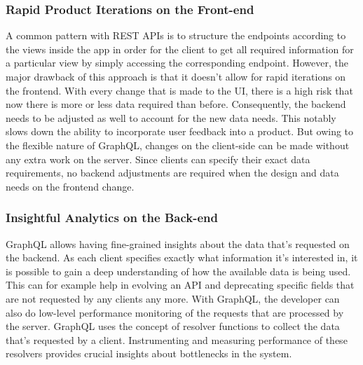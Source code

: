 \subsubsection{Rapid Product Iterations on the Front-end}

A common pattern with REST APIs is to structure the endpoints according to the views inside the app 
in order for the client to get all required information for a particular view by simply accessing the corresponding 
endpoint. However, the major drawback of this approach is that it doesn’t allow for rapid iterations on the frontend. 
With every change that is made to the UI, there is a high risk that now there is more or less data required than before.
Consequently, the backend needs to be adjusted as well to account for the new data needs. This notably slows down the 
ability to incorporate user feedback into a product. But owing to the flexible nature of GraphQL, changes on the 
client-side can be made without any extra work on the server. Since clients can specify their exact data requirements, 
no backend adjustments are required when the design and data needs on the frontend change.

\subsubsection{Insightful Analytics on the Back-end}

GraphQL allows having fine-grained insights about the data that’s requested on the backend. As each client specifies 
exactly what information it’s interested in, it is possible to gain a deep understanding of how the available data is being 
used. This can for example help in evolving an API and deprecating specific fields that are not requested by any clients any more.
With GraphQL, the developer can also do low-level performance monitoring of the requests that are processed by the server. 
GraphQL uses the concept of resolver functions to collect the data that’s requested by a client. Instrumenting and measuring 
performance of these resolvers provides crucial insights about bottlenecks in the system.~\cite{GraphQLvsREST}
